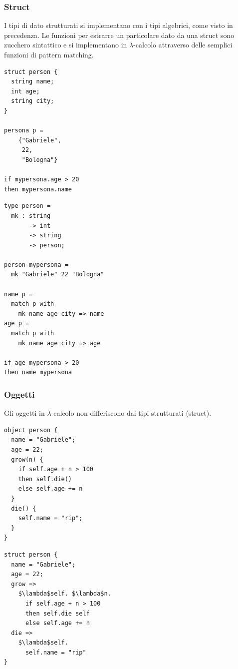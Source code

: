 \documentclass{article}
\begin{document}
\subsubsection{Struct}
I tipi di dato strutturati si implementano con i tipi algebrici, come visto in precedenza. Le funzioni per estrarre un particolare dato da una struct sono zucchero sintattico e si implementano in $\lambda$-calcolo attraverso delle semplici funzioni di pattern matching.

\begin{minipage}{0.49\textwidth}
\begin{lstlisting}[mathescape=true]
struct person {
  string name;
  int age;
  string city;
}

persona p =
    {"Gabriele",
     22,
     "Bologna"}

if mypersona.age > 20
then mypersona.name
\end{lstlisting}
\end{minipage}
\begin{minipage}{0.49\textwidth}
\begin{lstlisting}[mathescape=true]
type person =
  mk : string 
       -> int
       -> string
       -> person;

person mypersona =
  mk "Gabriele" 22 "Bologna"

name p = 
  match p with 
    mk name age city => name
age p =
  match p with
    mk name age city => age

if age mypersona > 20
then name mypersona
\end{lstlisting}
\end{minipage}

\subsubsection{Oggetti}
Gli oggetti in $\lambda$-calcolo non differiscono dai tipi strutturati (struct).

\begin{minipage}{0.49\textwidth}
\begin{lstlisting}[mathescape=true]
object person {
  name = "Gabriele";
  age = 22;
  grow(n) {
    if self.age + n > 100
    then self.die()
    else self.age += n
  }
  die() {
    self.name = "rip";
  }
}
\end{lstlisting}
\end{minipage}
\begin{minipage}{0.49\textwidth}
\begin{lstlisting}[mathescape=true]
struct person {
  name = "Gabriele";
  age = 22;
  grow =>
    $\lambda$self. $\lambda$n.
      if self.age + n > 100
      then self.die self
      else self.age += n
  die =>
    $\lambda$self.
      self.name = "rip" 
}
\end{lstlisting}
\end{minipage}
\end{document}
